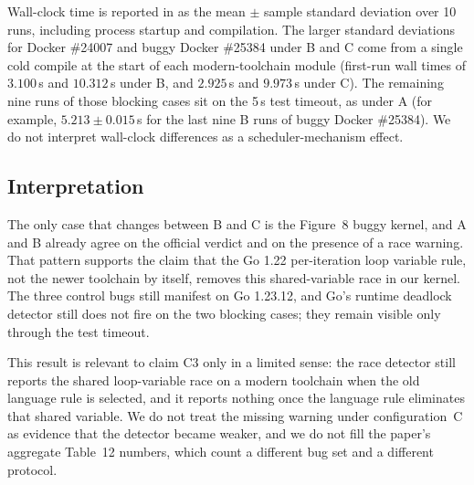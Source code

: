 Wall-clock time is reported in  as the mean $\pm$
sample standard deviation over 10 runs, including process startup and compilation.
The larger standard deviations for Docker \#24007 and buggy Docker \#25384 under
B and C come from a single cold compile at the start of each modern-toolchain
module (first-run wall times of $3.100$\,s and $10.312$\,s under B, and
$2.925$\,s and $9.973$\,s under C). The remaining nine runs of those blocking
cases sit on the 5\,s test timeout, as under A (for example, $5.213 \pm 0.015$\,s
for the last nine B runs of buggy Docker \#25384). We do not interpret wall-clock
differences as a scheduler-mechanism effect.

\subsection{Interpretation}
The only case that changes between B and C is the Figure~8 buggy kernel, and A
and B already agree on the official verdict and on the presence of a race
warning. That pattern supports the claim that the Go 1.22 per-iteration loop
variable rule, not the newer toolchain by itself, removes this shared-variable
race in our kernel. The three control bugs still manifest on Go 1.23.12, and
Go's runtime deadlock detector still does not fire on the two blocking cases;
they remain visible only through the test timeout.

This result is relevant to claim C3 only in a limited sense: the race detector
still reports the shared loop-variable race on a modern toolchain when the old
language rule is selected, and it reports nothing once the language rule
eliminates that shared variable. We do not treat the missing warning under
configuration~C as evidence that the detector became weaker, and we do not fill
the paper's aggregate Table~12 numbers, which count a different bug set and a
different protocol.


